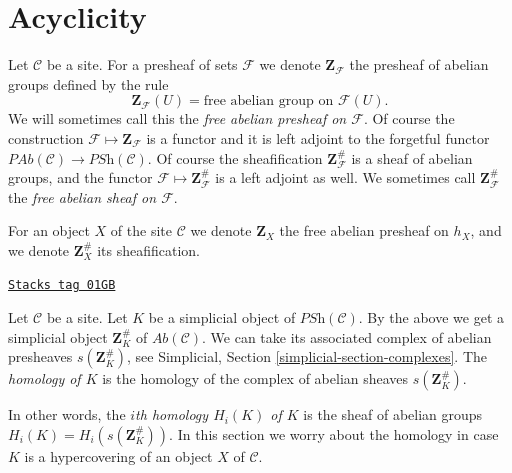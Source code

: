 \section{Acyclicity}
\label{hypercovering-section-acyclicity}
Let $\mathcal{C}$ be a site.
For a presheaf of sets $\mathcal{F}$ we denote $\mathbf{Z}_\mathcal{F}$
the presheaf of abelian groups defined by the rule
$$
\mathbf{Z}_\mathcal{F}(U) = \text{free abelian group on }\mathcal{F}(U).
$$
We will sometimes call this the {\it free abelian presheaf on $\mathcal{F}$}.
Of course the construction $\mathcal{F} \mapsto \mathbf{Z}_\mathcal{F}$
is a functor and it is left adjoint to the forgetful functor
$\textit{PAb}(\mathcal{C}) \to \textit{PSh}(\mathcal{C})$.
Of course the sheafification $\mathbf{Z}_\mathcal{F}^\#$ is
a sheaf of abelian groups, and the functor
$\mathcal{F} \mapsto \mathbf{Z}_\mathcal{F}^\#$ is a
left adjoint as well. We sometimes call $\mathbf{Z}_\mathcal{F}^\#$
the {\it free abelian sheaf on $\mathcal{F}$}.

\medskip\noindent
For an object $X$ of the site $\mathcal{C}$ we denote
$\mathbf{Z}_X$ the free abelian presheaf on $h_X$, and
we denote $\mathbf{Z}_X^\#$ its sheafification.

\begin{definition}[Homology]
\label{hypercovering-definition-homology}
\href{https://stacks.math.columbia.edu/tag/01GB}{\texttt{Stacks tag 01GB}}

Let $\mathcal{C}$ be a site.
Let $K$ be a simplicial object of $\textit{PSh}(\mathcal{C})$.
By the above we get a simplicial object $\mathbf{Z}_K^\#$ of
$\textit{Ab}(\mathcal{C})$. We can take its associated
complex of abelian presheaves $s(\mathbf{Z}_K^\#)$, see
Simplicial, Section \ref{simplicial-section-complexes}.
The {\it homology of $K$} is the homology of the
complex of abelian sheaves $s(\mathbf{Z}_K^\#)$.
\end{definition}

In other words, the {\it $i$th homology $H_i(K)$ of $K$}
is the sheaf of abelian groups $H_i(K) = H_i(s(\mathbf{Z}_K^\#))$.
In this section we worry about the homology in case $K$
is a hypercovering of an object $X$ of $\mathcal{C}$.

